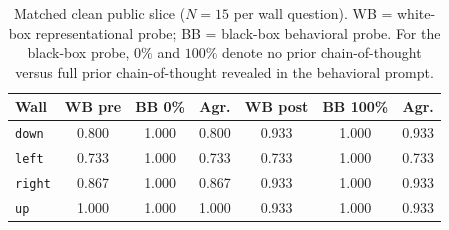 \documentclass[10pt,twocolumn]{article}
\begin{document}
\begin{table}[t]
\centering
\scriptsize
\setlength{\tabcolsep}{3.5pt}
\begin{tabular}{@{}lcccccc@{}}
\toprule
\textbf{Wall} &
\textbf{WB pre} &
\textbf{BB 0\%} &
\textbf{Agr.} &
\textbf{WB post} &
\textbf{BB 100\%} &
\textbf{Agr.} \\
\midrule
\texttt{down}  & 0.800 & 1.000 & 0.800 & 0.933 & 1.000 & 0.933 \\
\texttt{left}  & 0.733 & 1.000 & 0.733 & 0.733 & 1.000 & 0.733 \\
\texttt{right} & 0.867 & 1.000 & 0.867 & 0.933 & 1.000 & 0.933 \\
\texttt{up}    & 1.000 & 1.000 & 1.000 & 0.933 & 1.000 & 0.933 \\
\bottomrule
\end{tabular}
\caption{Matched clean public slice ($N=15$ per wall question). WB = white-box representational probe; BB = black-box behavioral probe. For the black-box probe, $0\%$ and $100\%$ denote no prior chain-of-thought versus full prior chain-of-thought revealed in the behavioral prompt.}\label{tab:agreement}
\end{table}







\end{document}
